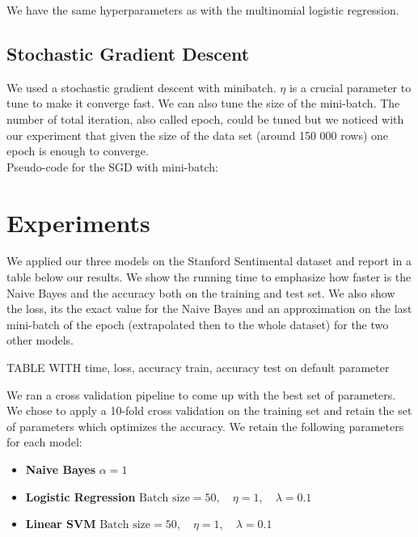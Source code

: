 \documentclass[11pt]{article}
\begin{document}
\noindent We have the same hyperparameters as with the multinomial logistic regression.

\subsection{Stochastic Gradient Descent}

We used a stochastic gradient descent with minibatch. $\eta$ is a crucial parameter to tune to make it converge fast. We can also tune the size of the mini-batch. The number of total iteration, also called epoch, could be tuned but we noticed with our experiment that given the size of the data set (around 150 000 rows) one epoch is enough to converge.\\


Pseudo-code for the SGD with mini-batch:

  \begin{algorithmic}[1]
    \EndFor{}
    \EndFor{}
    \State{\Return{$\theta$}}
  \end{algorithmic}


\section{Experiments}

We applied our three models on the Stanford Sentimental dataset and report in a table below our results. We show the running time to emphasize how faster is the Naive Bayes and the accuracy both on the training and test set. We also show the loss, its the exact value for the Naive Bayes and an approximation on the last mini-batch of the epoch (extrapolated then to the whole dataset) for the two other models.

TABLE WITH time, loss, accuracy train, accuracy test on default parameter


\noindent We ran a cross validation pipeline to come up with the best set of parameters. We chose to apply a 10-fold cross validation on the training set and retain the set of parameters which optimizes the accuracy. We retain the following parameters for each model:
\begin{itemize}
	\item \textbf{Naive Bayes} $\alpha = 1$
	\item \textbf{Logistic Regression} $\text{Batch size} = 50,\quad \eta = 1, \quad \lambda = 0.1$
	\item \textbf{Linear SVM} $\text{Batch size} = 50,\quad \eta = 1, \quad \lambda = 0.1$
\end{itemize}
\end{document}
